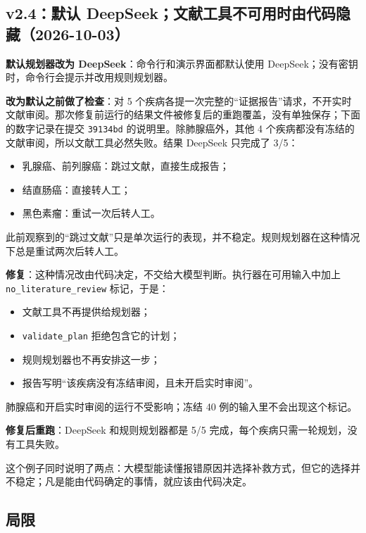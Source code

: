 \documentclass[
  10pt,
]{ctexart}
\providecommand{\tightlist}{%
  \setlength{\itemsep}{0pt}\setlength{\parskip}{0pt}}
\begin{document}
\subsection{v2.4：默认
DeepSeek；文献工具不可用时由代码隐藏（2026-10-03）}\label{v24ux9ed8ux8ba4-deepseekux6587ux732eux5de5ux5177ux4e0dux53efux7528ux65f6ux7531ux4ee3ux7801ux9690ux85cf2026-10-03}

\textbf{默认规划器改为 DeepSeek}：命令行和演示界面都默认使用
DeepSeek；没有密钥时，命令行会提示并改用规则规划器。

\textbf{改为默认之前做了检查}：对 5
个疾病各提一次完整的``证据报告''请求，不开实时文献审阅。那次修复前运行的结果文件被修复后的重跑覆盖，没有单独保存；下面的数字记录在提交
\texttt{39134bd} 的说明里。除肺腺癌外，其他 4
个疾病都没有冻结的文献审阅，所以文献工具必然失败。结果 DeepSeek 只完成了
3/5：

\begin{itemize}
\tightlist
\item
  乳腺癌、前列腺癌：跳过文献，直接生成报告；
\item
  结直肠癌：直接转人工；
\item
  黑色素瘤：重试一次后转人工。
\end{itemize}

此前观察到的``跳过文献''只是单次运行的表现，并不稳定。规则规划器在这种情况下总是重试两次后转人工。

\textbf{修复}：这种情况改由代码决定，不交给大模型判断。执行器在可用输入中加上
\texttt{no\_\allowbreak{}literature\_\allowbreak{}review} 标记，于是：

\begin{itemize}
\tightlist
\item
  文献工具不再提供给规划器；
\item
  \texttt{validate\_\allowbreak{}plan} 拒绝包含它的计划；
\item
  规则规划器也不再安排这一步；
\item
  报告写明``该疾病没有冻结审阅，且未开启实时审阅''。
\end{itemize}

肺腺癌和开启实时审阅的运行不受影响；冻结 40 例的输入里不会出现这个标记。

\textbf{修复后重跑}：DeepSeek 和规则规划器都是 5/5
完成，每个疾病只需一轮规划，没有工具失败。

这个例子同时说明了两点：大模型能读懂报错原因并选择补救方式，但它的选择并不稳定；凡是能由代码确定的事情，就应该由代码决定。

\subsection{局限}\label{ux5c40ux9650}
\end{document}
